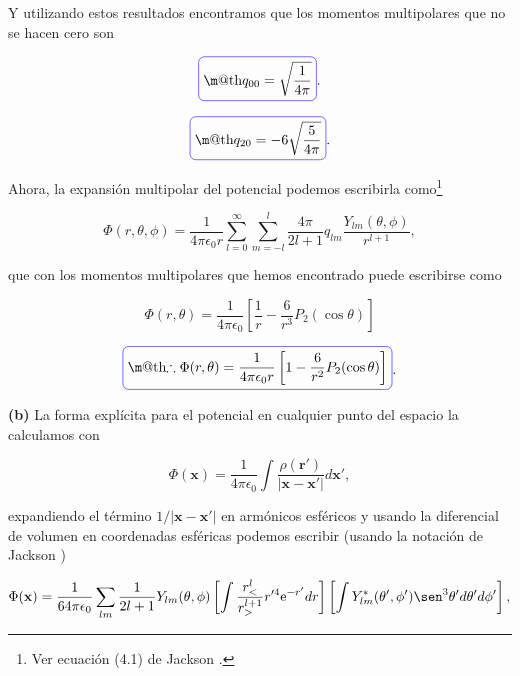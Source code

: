 \documentclass[a4paper,11pt]{article}
\makeatletter
\numberwithin{equation}{section}
\newcommand*{\boxcolor}{blue}
\renewcommand{\boxed}[1]{\textcolor{\boxcolor}{%
\tikz[baseline={([yshift=-1ex]current bounding box.center)}] \node [rectangle, minimum width=1ex,rounded corners,draw] {\normalcolor\m@th$\displaystyle#1$};}}
\newcommand{\euler}{\mathrm{e}}
\makeatother
\begin{document}
Y utilizando estos resultados encontramos que los momentos multipolares 
que no se hacen cero son 

\begin{equation}
 \boxed{q_{00} = \sqrt{\frac{1}{4\pi}}}.
\end{equation}

\begin{equation}
 \boxed{q_{20} = -6 \sqrt{\frac{5}{4\pi}}}.
\end{equation}

Ahora, la expansión multipolar del potencial podemos escribirla como\footnote{Ver 
ecuación (4.1) de Jackson \cite{jackson}.}

\begin{equation}
  \Phi(r,\theta,\phi) = \frac{1}{4\pi\epsilon_0 r}\sum_{l=0}^\infty 
 \sum_{m=-l}^l \frac{4\pi}{2l+1} 
 q_{lm} \frac{Y_{lm}(\theta,\phi)}{r^{l+1}},
\end{equation}

que con los momentos multipolares que hemos encontrado puede escribirse como 

\begin{equation}
  \Phi(r,\theta) = \frac{1}{4\pi\epsilon_0}\left[\frac{1}{r} - 
  \frac{6}{r^3}P_2(\cos{\theta})  \right]
\end{equation}

\begin{equation}
 \boxed{\therefore \Phi(r,\theta) = \frac{1}{4\pi\epsilon_0 r}\left[1 - 
  \frac{6}{r^2}P_2(\cos{\theta})\right]}.
\end{equation}

\textbf{(b)} La forma explícita para el potencial en cualquier punto del 
espacio la calculamos con 

\begin{equation}
 \Phi(\mathbf{x}) = \frac{1}{4\pi\epsilon_0} \int \frac{\rho(\mathbf{r}')}{|\mathbf{x} - 
 \mathbf{x}'|}d\mathbf{x}',
\end{equation}

expandiendo el término $1/|\mathbf{x} -  \mathbf{x}'|$ en armónicos esféricos y usando 
la diferencial de volumen en coordenadas esféricas podemos escribir (usando la notación 
de Jackson \cite{jackson})

\begin{equation}
 \Phi(\mathbf{x}) = \frac{1}{64\pi \epsilon_0 }\sum_{lm} \frac{1}{2l+1}Y_{lm}(\theta,\phi) 
 \left[\int \frac{r^l_{<}}{r^{l+1}_{>}}r'^4\euler^{-r'} dr\right]
 \left[\int Y^*_{lm}(\theta',\phi')\sen^3{\theta'}d\theta' d\phi' \right],
\end{equation}
\end{document}
